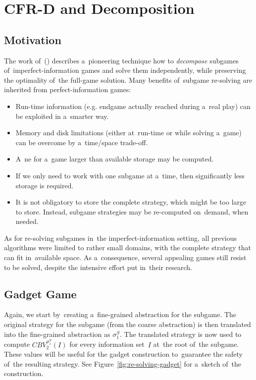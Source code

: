 \chapter{CFR-D and Decomposition}
\label{ch:cfr-d}

\section{Motivation}
The work of~(\cite{BurchJohansonBowling13}) describes a~pioneering technique how to \emph{decompose} subgames of~imperfect-information games and solve them independently, while preserving the optimality of~the full-game solution.
Many benefits of~subgame re-solving are inherited from perfect-information games:
\begin{itemize}
  \item Run-time information (e.g. endgame actually reached during a~real play) can be exploited in a~smarter way.
  \item Memory and disk limitations (either at~run-time or while solving a~game) can be overcome by a~time/space trade-off.
  \item A~\acrlong{ne} for a~game larger than available storage may be computed.
  \item If we only need to work with one subgame at a~time, then significantly less storage is required.
  \item It is not obligatory to store the complete strategy, which might be too large to store.
    Instead, subgame strategies may be re-computed on~demand, when needed.
\end{itemize}

As for re-solving subgames in~the imperfect-information setting, all previous algorithms were limited to rather small domains, with the complete strategy that can fit in~available space.
As a~consequence, several appealing games still resist to be solved, despite the intensive effort put in~their research.

\section{Gadget Game}
Again, we start by~creating a~fine-grained abstraction for the subgame.
The original strategy for the subgame (from the coarse abstraction) is then translated into the fine-grained abstraction as $\sigma_1^S$.
The translated strategy is now used to compute $CBV_2 ^{\sigma_1^S} (I)$ for every information set~$I$ at~the root of~the subgame.
These values will be useful for the gadget construction to~guarantee the safety of~the resulting strategy.
See Figure~\ref{fig:re-solving-gadget} for a~sketch of~the construction.

